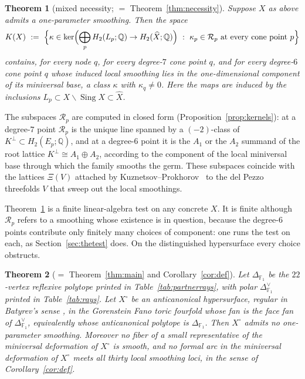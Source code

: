 \documentclass[11pt]{amsart}
\theoremstyle{definition}
\theoremstyle{remark}
\theoremstyle{plain}
\newtheorem{thmletter}{Theorem}
\newcommand{\QQ}{\mathbb{Q}}
\newcommand{\Rsm}{\mathcal{R}}   %
\newcommand{\Sing}{\operatorname{Sing}}
\newcommand{\Xh}{\widehat{X}}
\begin{document}
\begin{thmletter}[mixed necessity; $=$ Theorem~\ref{thm:necessity}]\label{thm:necessity-intro}
Suppose $X$ as above admits a one-parameter smoothing.  Then the space
\[
K(X)\ :=\ \Bigl\{\kappa\in\ker\Bigl(\bigoplus_pH_2(L_p;\QQ)
\to H_2(\Xh;\QQ)\Bigr)\ :\ \kappa_p\in \Rsm_p
\text{ at every cone point }p\Bigr\}
\]
contains, for every node $q$, for every degree-$7$ cone point $q$, and
for every degree-$6$ cone point $q$ whose induced local smoothing lies
in the one-dimensional component of its miniversal base, a class
$\kappa$ with $\kappa_q\neq0$.  Here the maps are induced by the
inclusions $L_p\subset X\smallsetminus\Sing X\subset\Xh$.
\end{thmletter}

The subspaces $\Rsm_p$ are computed in closed form
(Proposition~\ref{prop:kernels}): at a degree-$7$ point $\Rsm_p$ is the
unique line spanned by a $(-2)$-class of
$K^{\perp}\subset H_2(E_p;\QQ)$, and at a degree-$6$ point it is the
$A_1$ or the $A_2$ summand of the root lattice
$K^{\perp}\cong A_1\oplus A_2$, according to the component of the local
miniversal base through which the family smooths the germ.  These
subspaces coincide with the lattices $\Xi(V)$ attached by
Kuznetsov--Prokhorov~\cite[Theorem~1.9]{KP23} to the del Pezzo
threefolds $V$ that sweep out the local smoothings.

Theorem~\ref{thm:necessity-intro} is a finite linear-algebra test on any
concrete $X$.  It is finite although $\Rsm_p$ refers to a smoothing whose
existence is in question, because the degree-$6$ points contribute only finitely
many choices of component: one runs the test on each, as
Section~\ref{sec:thetest} does.  On the distinguished hypersurface every choice
obstructs.

\begin{thmletter}[$=$ Theorem~\ref{thm:main} and Corollary~\ref{cor:def}]\label{thm:xcirc-intro}
Let $\Delta_{\mathbb F_1}$ be the $22$-vertex reflexive polytope printed in
Table~\ref{tab:partnerrays}, with polar $\Delta_{\mathbb F_1}^{\vee}$ printed
in Table~\ref{tab:rays}.  Let $X^{\circ}$ be an anticanonical hypersurface,
regular in Batyrev's sense \cite[Def.~3.1.1]{Batyrev94}, in the Gorenstein
Fano toric fourfold whose fan is the face fan of
$\Delta_{\mathbb F_1}^{\vee}$, equivalently whose anticanonical polytope is
$\Delta_{\mathbb F_1}$.  Then $X^{\circ}$ admits no one-parameter
smoothing.  Moreover no fiber of a small representative of the
miniversal deformation of $X^{\circ}$ is smooth, and no formal
arc in the miniversal deformation of $X^{\circ}$ meets all thirty
local smoothing loci, in the sense of Corollary~\ref{cor:def}.
\end{thmletter}
\end{document}
